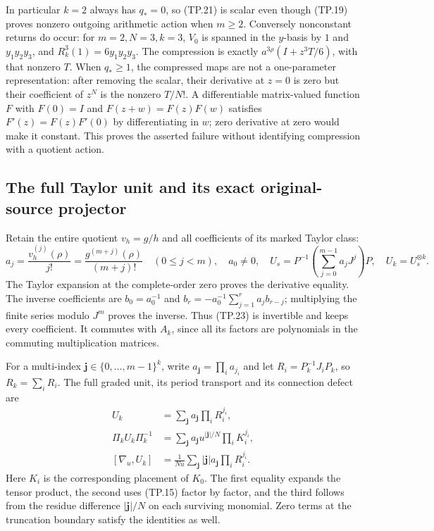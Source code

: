 In particular \(k=2\) always has \(q_*=0\), so (TP.21)
is scalar even though (TP.19) proves nonzero outgoing
arithmetic action when \(m\geq2\). Conversely nonconstant
returns do occur: for \(m=2,N=3,k=3\), \(V_0\) is spanned
in the \(y\)-basis by \(1\) and \(y_1y_2y_3\), and
\(R_k^3(1)=6y_1y_2y_3\). The compression is exactly
\(a^{3\rho}(I+z^3T/6)\), with that nonzero \(T\).
When \(q_*\geq1\), the compressed maps are not a
one-parameter representation: after removing the scalar,
their derivative at \(z=0\) is zero but their coefficient
of \(z^N\) is the nonzero \(T/N!\). A differentiable
matrix-valued function \(F\) with \(F(0)=I\) and
\(F(z+w)=F(z)F(w)\) satisfies \(F'(z)=F(z)F'(0)\)
by differentiating in \(w\); zero derivative at zero
would make it constant. This proves the asserted failure
without identifying compression with a quotient action.

\subsection{The full Taylor unit and its exact original-source projector}

Retain the entire quotient \(v_h=g/h\) and all coefficients
of its marked Taylor class:
\[
 a_j=\frac{v_h^{(j)}(\rho)}{j!}
     =\frac{g^{(m+j)}(\rho)}{(m+j)!}\quad(0\leq j<m),
 \quad a_0\ne0,\quad
 U_s=P^{-1}\left(\sum_{j=0}^{m-1}a_jJ^j\right)P,
 \quad U_k=U_s^{\otimes k}.
 \tag{TP.23}\label{CFStage:eq:tp-unit}
\]
The Taylor expansion at the complete-order zero proves
the derivative equality. The inverse coefficients are
\(b_0=a_0^{-1}\) and
\(b_r=-a_0^{-1}\sum_{j=1}^ra_jb_{r-j}\); multiplying
the finite series modulo \(J^m\) proves the inverse.
Thus (TP.23) is invertible and keeps every coefficient.
It commutes with \(A_k\), since all its factors are
polynomials in the commuting multiplication matrices.

For a multi-index \(\mathbf j\in\{0,\ldots,m-1\}^k\),
write \(a_{\mathbf j}=\prod_i a_{j_i}\) and let
\(R_i=P_k^{-1}J_iP_k\), so \(R_k=\sum_iR_i\).
The full graded unit, its period transport and its
connection defect are
\[
 \begin{split}
 U_k&=\sum_{\mathbf j}a_{\mathbf j}\prod_iR_i^{j_i},\\
 \Pi_kU_k\Pi_k^{-1}
   &=\sum_{\mathbf j}a_{\mathbf j}u^{|\mathbf j|/N}
                              \prod_iK_i^{j_i},\\
 [\nabla_u,U_k]
   &=\frac1{Nu}\sum_{\mathbf j}|\mathbf j|a_{\mathbf j}
                              \prod_iR_i^{j_i}.
 \end{split}
 \tag{TP.24}\label{CFStage:eq:tp-unittransport}
\]
Here \(K_i\) is the corresponding placement of \(K_0\).
The first equality expands the tensor product, the
second uses (TP.15) factor by factor, and the third
follows from the residue difference \(|\mathbf j|/N\)
on each surviving monomial. Zero terms at the truncation
boundary satisfy the identities as well.

